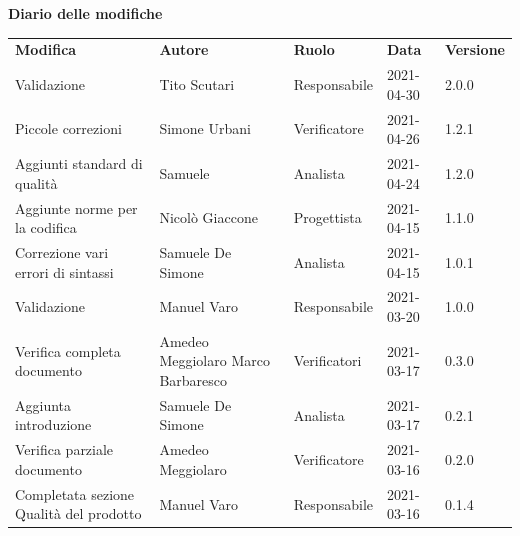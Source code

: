 \documentclass[a4paper]{article}
\begin{document}
\begin{center}

    \textbf{\Large Diario delle modifiche}\\
    \vspace{10px}
    \begin{table}[h!]
        \centering
        \renewcommand{\arraystretch}{1.8}
        \begin{tabular}{p{160px} p{86px} p{70px} p{60px} p{45px}}
            \rowcolor{logo!70} \textbf{Modifica}        & \textbf{Autore}                             & \textbf{Ruolo} & \textbf{Data} & \textbf{Versione} \\
            Validazione                                 & Tito Scutari                                & Responsabile   & 2021-04-30    & 2.0.0             \\
            Piccole correzioni                          & Simone Urbani                               & Verificatore   & 2021-04-26    & 1.2.1             \\
            Aggiunti standard di qualità                & Samuele                                     & Analista       & 2021-04-24    & 1.2.0             \\
            Aggiunte norme per la codifica              & Nicolò Giaccone                             & Progettista    & 2021-04-15    & 1.1.0             \\
            Correzione vari errori di sintassi          & Samuele De Simone                           & Analista       & 2021-04-15    & 1.0.1             \\
            Validazione                                 & Manuel Varo                                 & Responsabile   & 2021-03-20    & 1.0.0             \\
            Verifica completa documento                 & Amedeo Meggiolaro \newline Marco Barbaresco & Verificatori   & 2021-03-17    & 0.3.0             \\
            Aggiunta introduzione                       & Samuele De Simone                           & Analista       & 2021-03-17    & 0.2.1             \\
            Verifica parziale documento                 & Amedeo Meggiolaro                           & Verificatore   & 2021-03-16    & 0.2.0             \\
            Completata sezione Qualità del prodotto     & Manuel Varo                                 & Responsabile   & 2021-03-16    & 0.1.4             \\

\end{tabular}
\end{table}
\end{center}
\end{document}
